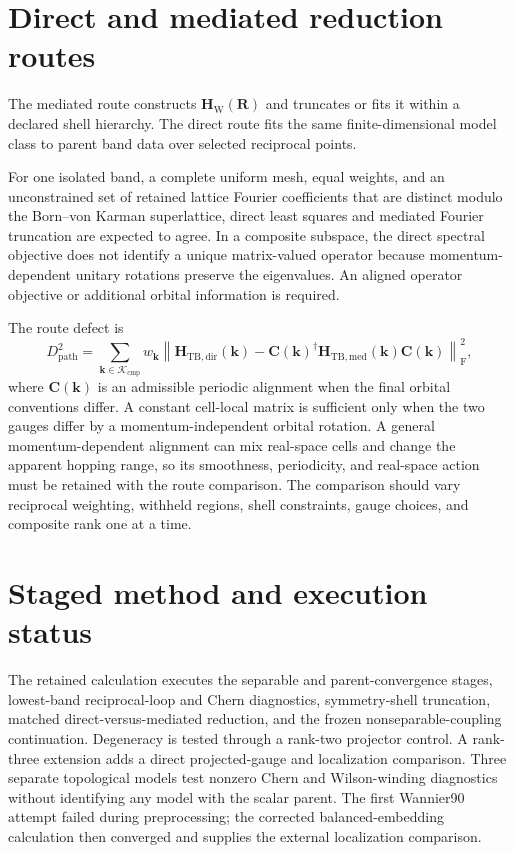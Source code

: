 \section{Direct and mediated reduction routes}

The mediated route constructs $\mathbf H_{\mathrm W}(\mathbf R)$ and truncates
or fits it within a declared shell hierarchy. The direct route fits the same
finite-dimensional model class to parent band data over selected reciprocal
points.

For one isolated band, a complete uniform mesh, equal weights, and an
unconstrained set of retained lattice Fourier coefficients that are distinct
modulo the Born--von Karman superlattice, direct least squares and mediated
Fourier truncation are expected to agree. In a composite subspace,
the direct spectral objective does not identify a unique matrix-valued operator
because momentum-dependent unitary rotations preserve the eigenvalues. An
aligned operator objective or additional orbital information is required.

The route defect is
\begin{equation}
    D_{\mathrm{path}}^2
    =
    \sum_{\mathbf k\in\mathcal K_{\mathrm{cmp}}}
    w_{\mathbf k}
    \left\lVert
        \mathbf H_{\mathrm{TB,dir}}(\mathbf k)
        -
        \mathbf C(\mathbf k)^\dagger
        \mathbf H_{\mathrm{TB,med}}(\mathbf k)
        \mathbf C(\mathbf k)
    \right\rVert_{\mathrm F}^2,
\end{equation}
where $\mathbf C(\mathbf k)$ is an admissible periodic alignment when the
final orbital conventions differ. A constant cell-local matrix is sufficient
only when the two gauges differ by a momentum-independent orbital rotation. A
general momentum-dependent alignment can mix real-space cells and change the
apparent hopping range, so its smoothness, periodicity, and real-space action
must be retained with the route comparison. The comparison should vary
reciprocal weighting, withheld regions, shell constraints, gauge choices, and
composite rank one at a time.

\section{Staged method and execution status}

The retained calculation executes the separable and parent-convergence stages,
lowest-band reciprocal-loop and Chern diagnostics, symmetry-shell truncation,
matched direct-versus-mediated reduction, and the frozen nonseparable-coupling
continuation. Degeneracy is tested through a rank-two projector control. A
rank-three extension adds a direct projected-gauge and localization comparison.
Three separate topological models test nonzero Chern and Wilson-winding
diagnostics without identifying any model with the scalar parent. The first
Wannier90 attempt failed during preprocessing; the corrected balanced-embedding
calculation then converged and supplies the external localization comparison.

